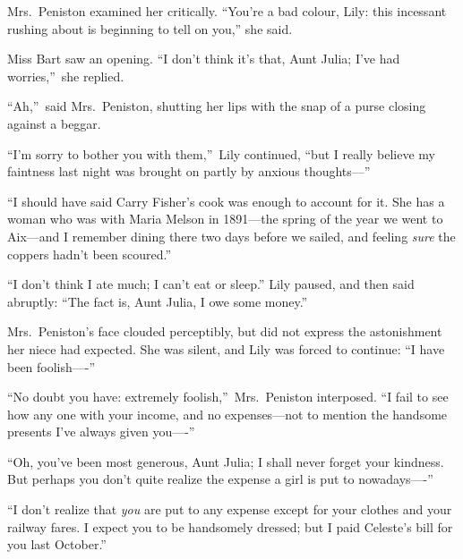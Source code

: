 \documentclass[12pt,a4paper]{book}
\begin{document}
Mrs.\ Peniston examined her critically. ``You're a bad colour,
Lily: this incessant rushing about is beginning to tell on you,''
she said.





Miss Bart saw an opening. ``I don't think it's that, Aunt Julia;
I've had worries,''\ she replied.





``Ah,''\ said Mrs.\ Peniston, shutting her lips with the snap of a
purse closing against a beggar.





``I'm sorry to bother you with them,''\ Lily continued, ``but I
really believe my faintness last night was brought on partly by
anxious thoughts---''





``I should have said Carry Fisher's cook was enough to account for
it. She has a woman who was with Maria Melson in 1891---the spring
of the year we went to Aix---and I remember dining there two days
before we sailed, and feeling \textit{sure} the coppers hadn't been
scoured.''





``I don't think I ate much; I can't eat or sleep.'' Lily paused,
and then said abruptly: ``The fact is, Aunt Julia, I owe some
money.''





Mrs.\ Peniston's face clouded perceptibly, but did not
express the astonishment her niece had expected. She was silent,
and Lily was forced to continue: ``I have been foolish----''





``No doubt you have: extremely foolish,''\ Mrs.\ Peniston interposed. 
``I fail to see how any one with your income, and no expenses---not
to mention the handsome presents I've always given you----''





``Oh, you've been most generous, Aunt Julia; I shall never forget
your kindness. But perhaps you don't quite realize the expense a
girl is put to nowadays----''





``I don't realize that \textit{you} are put to any expense except for your
clothes and your railway fares. I expect you to be handsomely
dressed; but I paid Celeste's bill for you last October.''
\end{document}
